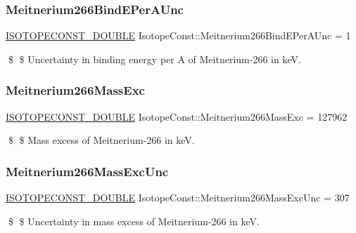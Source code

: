 \subsubsection{\texorpdfstring{Meitnerium266\+Bind\+E\+Per\+A\+Unc}{Meitnerium266BindEPerAUnc}}
{\footnotesize\ttfamily \mbox{\hyperlink{group___isotope_const-_macros_ga8f45a7272ce02c0b4c65c44636ed719a}{I\+S\+O\+T\+O\+P\+E\+C\+O\+N\+S\+T\+\_\+\+D\+O\+U\+B\+LE}} Isotope\+Const\+::\+Meitnerium266\+Bind\+E\+Per\+A\+Unc = 1}

\$ \$ Uncertainty in binding energy per A of Meitnerium-\/266 in keV. \mbox{\label{group___isotope_const-_meitnerium-_mt266_ga1e1467c6e1d0a55473411757b7eb7a89}} 
\subsubsection{\texorpdfstring{Meitnerium266\+Mass\+Exc}{Meitnerium266MassExc}}
{\footnotesize\ttfamily \mbox{\hyperlink{group___isotope_const-_macros_ga8f45a7272ce02c0b4c65c44636ed719a}{I\+S\+O\+T\+O\+P\+E\+C\+O\+N\+S\+T\+\_\+\+D\+O\+U\+B\+LE}} Isotope\+Const\+::\+Meitnerium266\+Mass\+Exc = 127962}

\$ \$ Mass excess of Meitnerium-\/266 in keV. \mbox{\label{group___isotope_const-_meitnerium-_mt266_ga5282ef74fd745009ced7e477737e001d}} 
\subsubsection{\texorpdfstring{Meitnerium266\+Mass\+Exc\+Unc}{Meitnerium266MassExcUnc}}
{\footnotesize\ttfamily \mbox{\hyperlink{group___isotope_const-_macros_ga8f45a7272ce02c0b4c65c44636ed719a}{I\+S\+O\+T\+O\+P\+E\+C\+O\+N\+S\+T\+\_\+\+D\+O\+U\+B\+LE}} Isotope\+Const\+::\+Meitnerium266\+Mass\+Exc\+Unc = 307}

\$ \$ Uncertainty in mass excess of Meitnerium-\/266 in keV. \mbox{\label{group___isotope_const-_meitnerium-_mt266_gaa2b44880a2f8d8ca87666c91686f6d3c}} 
